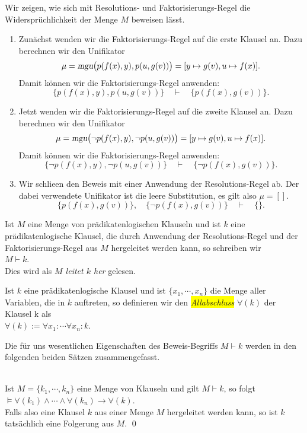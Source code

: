 \noindent
Wir zeigen, wie sich mit Resolutions- und Faktorisierungs-Regel die Widerspr\"{u}chlichkeit
der Menge $M$ beweisen l\"{a}sst.
\begin{enumerate}
\item Zun\"{a}chst wenden wir die Faktorisierungs-Regel auf die erste Klausel an. 
      Dazu berechnen wir den Unifikator 
      \[ \mu = \textsl{mgu}\bigl(p(f(x),y), p(u,g(v))\bigr) = [y \mapsto g(v), u \mapsto f(x)]. \]
      Damit k\"{o}nnen wir die Faktorisierungs-Regel anwenden: 
      \[ \bigl\{p(f(x),y), p(u,g(v))\bigr\} \quad \vdash \quad \bigl\{p(f(x),g(v))\bigr\}. \]
\item Jetzt wenden wir die Faktorisierungs-Regel auf die zweite Klausel an.
      Dazu berechnen wir  den Unifikator 
      \[ \mu = \textsl{mgu}\bigl(\neg p(f(x),y), \neg p(u,g(v))\bigr) = [y \mapsto g(v), u \mapsto f(x)]. 
      \]
      Damit k\"{o}nnen wir die Faktorisierungs-Regel anwenden: 
      \[ \bigl\{ \neg p(f(x),y), \neg p(u,g(v))\bigr\} \quad \vdash \quad \bigl\{\neg p(f(x),g(v))\bigr\}.
      \]
\item Wir schlie\3en den Beweis mit einer Anwendung der Resolutions-Regel ab.
      Der dabei verwendete Unifikator ist die leere Substitution, es gilt also $\mu = []$.      
      \[ \bigl\{p(f(x),g(v))\bigr\}, \quad \bigl\{\neg p(f(x),g(v))\bigr\} \quad \vdash \quad \{\}. \]
\end{enumerate}
Ist $M$ eine Menge von pr\"{a}dikatenlogischen Klauseln und ist $k$ eine pr\"{a}dikatenlogische
Klausel, die durch Anwendung der Resolutions-Regel und der Faktorisierungs-Regel aus $M$
hergeleitet werden kann, so schreiben wir \\[0.2cm]
\hspace*{1.3cm} $M \vdash k$.
\\[0.2cm]
Dies wird als \emph{$M$ leitet $k$ her} gelesen.

\begin{Definition}[Allabschluss]
  Ist $k$ eine pr\"{a}dikatenlogische Klausel und ist $\{x_1,\cdots,x_n\}$
  die Menge aller Variablen, die in $k$ auftreten, so definieren wir
  den \colorbox{yellow}{\emph{Allabschluss}}  $\forall(k)$  der Klausel k als \\[0.2cm]
  \hspace*{1.3cm} $\forall(k) := \forall x_1\colon \cdots \forall x_n \colon k$. \eox
\end{Definition}

\noindent
Die f\"{u}r uns wesentlichen Eigenschaften des Beweis-Begriffs $M \vdash k$ werden in den folgenden
beiden S\"{a}tzen zusammengefasst.
\begin{Satz} \hspace*{\fill} \\
    Ist $M = \{k_1,\cdots,k_n\}$ eine Menge von Klauseln und gilt $M \vdash k$, so folgt \\[0.2cm]
    \hspace*{1.3cm} $\models \forall(k_1) \wedge \cdots \wedge \forall(k_n) \rightarrow \forall(k)$. \\[0.2cm]
    Falls also eine Klausel $k$ aus einer Menge $M$ hergeleitet werden kann,
    so ist $k$ tats\"{a}chlich eine Folgerung aus $M$. \qed
\end{Satz}


